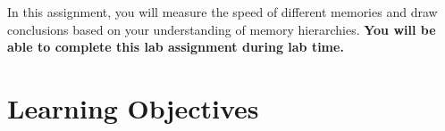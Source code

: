 



\usepackage{graphicx}

\usepackage{xparse}
\usepackage{tikz}
\usetikzlibrary{shadows}
\usepackage{lipsum}\usepackage{array,color,colortbl}
\usepackage{listings}
\usepackage{lstlangarm}


\NewDocumentCommand{}

\renewcommand{\labnumber}{\memorylabnumber}
\renewcommand{\labname}{Memory Measurement Lab}
\renewcommand{\shortlabname}{memorylab}
\renewcommand{\collaborationrules}{\memorylabcollaboration}
\renewcommand{\duedate}{\memorylabdue}
\newcommand{\nano}{\developmentboard} %
\renewcommand{\runtimeenvironment}{\memorylabenvironment}
\pagelayout

\labidentifier


In this assignment, you will measure the speed of different memories and draw
conclusions based on your understanding of memory hierarchies. \textbf{You will
be able to complete this lab assignment during lab time.}


\section*{Learning Objectives}

